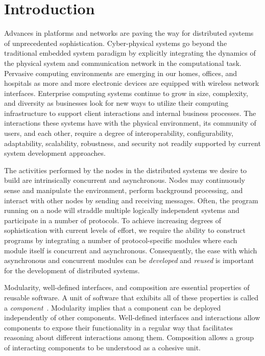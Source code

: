 \section{Introduction\label{introduction}}

Advances in platforms and networks are paving the way for distributed systems of unprecedented sophistication.
Cyber-physical systems go beyond the traditional embedded system paradigm by explicitly integrating the dynamics of the physical system and communication network in the computational task.
Pervasive computing environments are emerging in our homes, offices, and hospitals as more and more electronic devices are equipped with wireless network interfaces.
Enterprise computing systems continue to grow in size, complexity, and diversity as businesses look for new ways to utilize their computing infrastructure to support client interactions and internal business processes.
The interactions these systems have with the physical environment, its community of users, and each other, require a degree of interoperability, configurability, adaptability, scalability, robustness, and security not readily supported by current system development approaches.

The activities performed by the nodes in the distributed systems we desire to build are intrinsically concurrent and asynchronous.
Nodes may continuously sense and manipulate the environment, perform background processing, and interact with other nodes by sending and receiving messages.
Often, the program running on a node will straddle multiple logically independent systems and participate in a number of protocols.
To achieve increasing degrees of sophistication with current levels of effort, we require the ability to construct programs by integrating a number of protocol-specific modules where each module itself is concurrent and asynchronous.
Consequently, the ease with which asynchronous and concurrent modules can be \emph{developed} and \emph{reused} is important for the development of distributed systems.

Modularity, well-defined interfaces, and composition are essential properties of reusable software.
A unit of software that exhibits all of these properties is called a \emph{component}~\cite{szyperski2002component}.
Modularity implies that a component can be deployed independently of other components.
Well-defined interfaces and interactions allow components to expose their functionality in a regular way that facilitates reasoning about different interactions among them.
Composition allows a group of interacting components to be understood as a cohesive unit.

